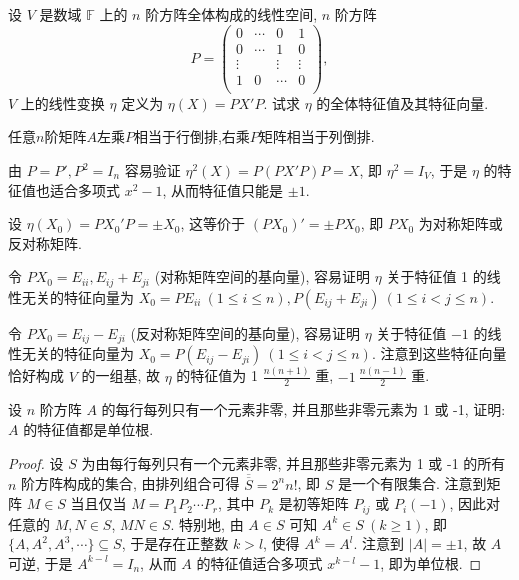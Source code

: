 \documentclass[../../main.tex]{subfiles}
\begin{document}
\begin{example}
设 \( V \) 是数域 \( \mathbb{F} \) 上的 \( n \) 阶方阵全体构成的线性空间, \( n \) 阶方阵
\[
P=\left( \begin{matrix}
0&		\cdots&		0&		1\\
0&		\cdots&		1&		0\\
\vdots&		&		\vdots&		\vdots\\
1&		0&		\cdots&		0\\
\end{matrix} \right) ,
\]
\( V \) 上的线性变换 \( \eta \) 定义为 \( \eta(X) = PX'P \). 试求 \( \eta \) 的全体特征值及其特征向量.
\end{example}
\begin{note}
任意$n$阶矩阵$A$左乘$P$相当于行倒排,右乘$P$矩阵相当于列倒排.
\end{note}
\begin{solution}
由 \( P = P', P^2 = I_n \) 容易验证 \( \eta^2(X) = P(PX'P)P = X \), 即 \( \eta^2 = I_V \), 于是 \( \eta \) 的特征值也适合多项式 \( x^2 - 1 \), 从而特征值只能是 \( \pm 1 \).

设 \( \eta(X_0) = PX_0'P = \pm X_0 \), 这等价于 \( (PX_0)' = \pm PX_0 \), 即 \( PX_0 \) 为对称矩阵或反对称矩阵. 

令 \( PX_0 = E_{ii}, E_{ij} + E_{ji} \) (对称矩阵空间的基向量), 容易证明 \( \eta \) 关于特征值 1 的线性无关的特征向量为 \( X_0 = PE_{ii} \ (1 \leqslant  i \leqslant  n), P(E_{ij} + E_{ji}) \ (1 \leqslant  i < j \leqslant  n) \).

令 \( PX_0 = E_{ij} - E_{ji} \) (反对称矩阵空间的基向量), 容易证明 \( \eta \) 关于特征值 \( -1 \) 的线性无关的特征向量为 \( X_0 = P(E_{ij} - E_{ji}) \ (1 \leqslant  i < j \leqslant  n) \). 注意到这些特征向量恰好构成 \( V \) 的一组基, 故 \( \eta \) 的特征值为 1 \( \frac{n(n+1)}{2} \) 重, \( -1 \ \frac{n(n-1)}{2} \) 重.

\end{solution}

\begin{example}
设 \( n \) 阶方阵 \( A \) 的每行每列只有一个元素非零, 并且那些非零元素为 1 或 -1, 证明: \( A \) 的特征值都是单位根.
\end{example}
\begin{proof}
设 \( S \) 为由每行每列只有一个元素非零, 并且那些非零元素为 1 或 -1 的所有 \( n \) 阶方阵构成的集合, 由排列组合可得 \( \overline{\overline{S}} = 2^n n! \), 即 \( S \) 是一个有限集合. 注意到矩阵 \( M \in S \) 当且仅当 \( M = P_1 P_2 \cdots P_r \), 其中 \( P_k \) 是初等矩阵 \( P_{ij} \) 或 \( P_i(-1) \), 因此对任意的 \( M, N \in S \), \( MN \in S \). 特别地, 由 \( A \in S \) 可知 \( A^k \in S \ (k \geqslant  1) \), 即 \( \{A, A^2, A^3, \cdots\} \subseteq S \), 于是存在正整数 \( k > l \), 使得 \( A^k = A^l \). 注意到 \( |A| = \pm 1 \), 故 \( A \) 可逆, 于是 \( A^{k-l} = I_n \), 从而 \( A \) 的特征值适合多项式 \( x^{k-l} - 1 \), 即为单位根.

\end{proof}
\end{document}
